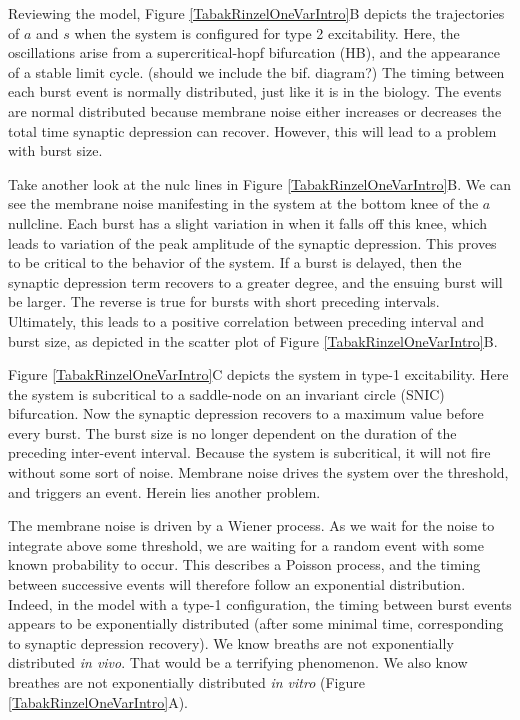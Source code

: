\documentclass[12pt]{article}
\begin{document}
Reviewing the model, Figure \ref{TabakRinzelOneVarIntro}B depicts the trajectories of $a$ and $s$ when the system is configured for type 2 excitability. Here, the oscillations arise from a supercritical-hopf bifurcation (HB), and the appearance of a stable limit cycle. (should we include the bif. diagram?) The timing between each burst event is normally distributed, just like it is in the biology. The events are normal distributed because membrane noise either increases or decreases the total time synaptic depression can recover. However, this will lead to a problem with burst size.

Take another look at the nulc lines in Figure \ref{TabakRinzelOneVarIntro}B. We can see the membrane noise manifesting in the system at the bottom knee of the $a$ nullcline. Each burst has a slight variation in when it falls off this knee, which leads to variation of the peak amplitude of the synaptic depression. This proves to be critical to the behavior of the system. If a burst is delayed, then the synaptic depression term recovers to a greater degree, and the ensuing burst will be larger. The reverse is true for bursts with short preceding intervals. Ultimately, this leads to a positive correlation between preceding interval and burst size, as depicted in the scatter plot of Figure \ref{TabakRinzelOneVarIntro}B. 

Figure \ref{TabakRinzelOneVarIntro}C depicts the system in type-1 excitability. Here the system is subcritical to a saddle-node on an invariant circle (SNIC) bifurcation. Now the synaptic depression recovers to a maximum value before every burst. The burst size is no longer dependent on the duration of the preceding inter-event interval. Because the system is subcritical, it will not fire without some sort of noise. Membrane noise drives the system over the threshold, and triggers an event. Herein lies another problem.

The membrane noise is driven by a Wiener process. As we wait for the noise to integrate above some threshold, we are waiting for a random event with some known probability to occur. This describes a Poisson process, and the timing between successive events will therefore follow an exponential distribution. Indeed, in the model with a type-1 configuration, the timing between burst events appears to be exponentially distributed (after some minimal time, corresponding to synaptic depression recovery). We know breaths are not exponentially distributed \textit{in vivo}. That would be a terrifying phenomenon. We also know breathes are not exponentially distributed \textit{in vitro} (Figure \ref{TabakRinzelOneVarIntro}A).
\end{document}
